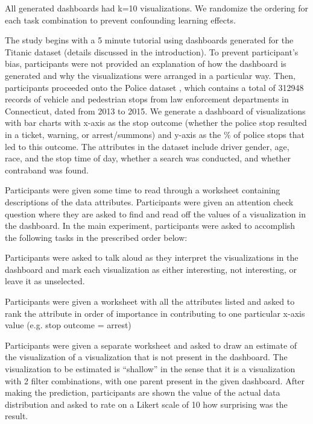 All generated dashboards had k=10 visualizations. We randomize the ordering for each task combination to prevent confounding learning effects. 
\par The study begins with a 5 minute tutorial using dashboards generated for the Titanic dataset (details discussed in the introduction). To prevent participant's bias, participants were not provided an explanation of how the dashboard is generated and why the visualizations were arranged in a particular way. Then, participants proceeded onto the Police dataset\cite{police} %
, which contains a total of 312948 records of vehicle and pedestrian stops from law enforcement departments in Connecticut, dated from 2013 to 2015. We generate a dashboard of visualizations with bar charts with x-axis as the stop outcome (whether the police stop resulted in a ticket, warning, or arrest/summons) and y-axis as the \% of police stops that led to this outcome. The attributes in the dataset include driver gender, age, race, and the stop time of day, whether a search was conducted, and whether contraband was found.
\par Participants were given some time to read through a worksheet containing descriptions of the data attributes. Participants were given an attention check question where they are asked to find and read off the values of a visualization in the dashboard. In the main experiment, participants were asked to accomplish the following tasks in the prescribed order below:

 Participants were asked to talk aloud as they interpret the visualizations in the dashboard and mark each visualization as either interesting, not interesting, or leave it as unselected.

 Participants were given a worksheet with all the attributes listed and asked to rank the attribute in order of importance in contributing to one particular x-axis value (e.g. stop outcome = arrest)

 Participants were given a separate worksheet and asked to draw an estimate of the visualization of a visualization that is not present in the dashboard. The visualization to be estimated is ``shallow'' in the sense that it is a visualization with 2 filter combinations, with one parent present in the given dashboard. After making the prediction, participants are shown the value of the actual data distribution and asked to rate on a Likert scale of 10 how surprising was the result.

